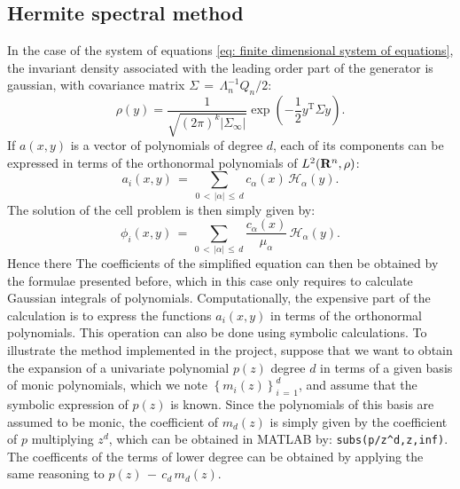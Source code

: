 \subsection{Hermite spectral method}
\label{sub:Hermite spectral method}
In the case of the system of equations \eqref{eq: finite dimensional system of equations}, the invariant density associated with the leading order part of the generator is gaussian, with covariance matrix $\Sigma \,=\, \Lambda_n^{-1} Q_n /2$:
\begin{equation*}
    \rho(y)= \frac{1}{\sqrt{(2\pi)^k| \Sigma_\infty|}}\exp\left(-\frac{1}{2}y^\mathrm{T}\Sigma y \right).
\end{equation*}
If $a(x,y)$ is a vector of polynomials of degree $d$, each of its components can be expressed in terms of the orthonormal polynomials of $L^{2}(\mathbf R^n,\rho)$:
\begin{equation*}
    a_i(x,y) \,=\, \sum_{0\,<\,|\alpha|\,\leq\,d} c_{\alpha} (x) \, \mathcal H_{\alpha}(y).
\end{equation*}
The solution of the cell problem is then simply given by:
\begin{equation*}
    \phi_i(x,y) \,=\,\sum_{0 \,<\,|\alpha| \,\leq\, d} \frac{c_\alpha(x)}{\mu_\alpha}\,   \mathcal H_{\alpha}(y).
\end{equation*}
Hence there The coefficients of the simplified equation can then be obtained by the formulae presented before, which in this case only requires to calculate Gaussian integrals of polynomials.
Computationally, the expensive part of the calculation is to express the functions $a_i(x,y)$ in terms of the orthonormal polynomials.
This operation can also be done using symbolic calculations. To illustrate the method implemented in the project, suppose that we want to obtain the expansion of a univariate polynomial $p(z)$ degree $d$ in terms of a given basis of monic polynomials, which we note $\left\{m_i(z)\right\}_{ i\,=\,1}^{ d}$, and assume that the symbolic expression of $p(z)$ is known.
Since the polynomials of this basis are assumed to be monic, the coefficient of $m_d(z)$ is simply given by the coefficient of $p$ multiplying $z^d$, which can be obtained in MATLAB by: \verb?subs(p/z^d,z,inf)?. The coefficents of the terms of lower degree can be obtained by applying the same reasoning to $p(z) \,-\,c_d\,m_d(z)$.

